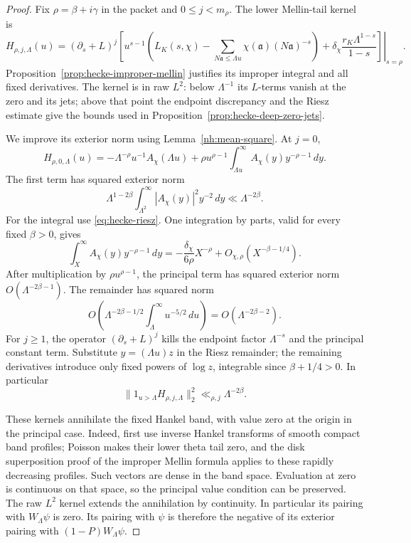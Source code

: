 \begin{proof}
Fix $\rho=\beta+i\gamma$ in the packet and $0\leq j<m_\rho$.
The lower Mellin-tail kernel is
\[
 H_{\rho,j,\Lambda}(u)=
 \left.(\partial_s+L)^j\left[
 u^{s-1}\left(L_K(s,\chi)
       -\sum_{N\mathfrak a\leq\Lambda u}
                   \chi(\mathfrak a)(N\mathfrak a)^{-s}\right)
 +\delta_\chi\frac{r_K\Lambda^{1-s}}{1-s}
 \right]\right|_{s=\rho}.
\]
Proposition~\ref{prop:hecke-improper-mellin} justifies its
improper integral and all fixed derivatives. The kernel is in
raw $L^2$: below $\Lambda^{-1}$ its $L$-terms vanish at the
zero and its jets; above that point the endpoint discrepancy
and the Riesz estimate give the bounds used in
Proposition~\ref{prop:hecke-deep-zero-jets}.

We improve its exterior norm using
Lemma~\ref{nh:mean-square}. At $j=0$,
\[
 H_{\rho,0,\Lambda}(u)
 =-\Lambda^{-\rho}u^{-1}A_\chi(\Lambda u)
 +\rho u^{\rho-1}\int_{\Lambda u}^\infty
                             A_\chi(y)y^{-\rho-1}\,dy.
\]
The first term has squared exterior norm
\[
 \Lambda^{1-2\beta}\int_{\Lambda^2}^\infty
                         |A_\chi(y)|^2y^{-2}\,dy
                                      \ll\Lambda^{-2\beta}.
\]
For the integral use \eqref{eq:hecke-riesz}. One integration
by parts, valid for every fixed $\beta>0$, gives
\[
 \int_X^\infty A_\chi(y)y^{-\rho-1}\,dy
 =-\frac{\delta_\chi}{6\rho}X^{-\rho}
                         +O_{\chi,\rho}(X^{-\beta-1/4}).
\]
After multiplication by $\rho u^{\rho-1}$, the principal
term has squared exterior norm $O(\Lambda^{-2\beta-1})$.
The remainder has squared norm
\[
 O\left(\Lambda^{-2\beta-1/2}
                      \int_\Lambda^\infty u^{-5/2}\,du\right)
                         =O(\Lambda^{-2\beta-2}).
\]
For $j\geq1$, the operator $(\partial_s+L)^j$ kills the
endpoint factor $\Lambda^{-s}$ and the principal constant
term. Substitute $y=(\Lambda u)z$ in the Riesz remainder;
the remaining derivatives introduce only fixed powers of
$\log z$, integrable since $\beta+1/4>0$. In particular
\begin{equation}\label{nh:zero-tail-norm}
 \|1_{u>\Lambda}H_{\rho,j,\Lambda}\|_2^2
                                  \ll_{\rho,j}\Lambda^{-2\beta}.
\end{equation}

These kernels annihilate the fixed Hankel band, with value
zero at the origin in the principal case. Indeed, first use
inverse Hankel transforms of smooth compact band profiles;
Poisson makes their lower theta tail zero, and the disk
superposition proof of the improper Mellin formula applies
to these rapidly decreasing profiles. Such vectors are dense
in the band space. Evaluation at zero is continuous on that
space, so the principal value condition can be preserved.
The raw $L^2$ kernel extends the annihilation by continuity.
In particular its pairing with $W_\Lambda\psi$ is zero.
Its pairing with $\psi$ is therefore the negative of its
exterior pairing with $(1-P)W_\Lambda\psi$.


\end{proof}
